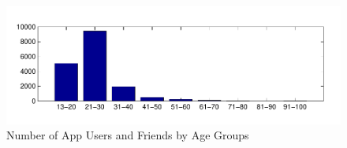 \begin{figure}[t!]
\centering
\includegraphics[scale=0.5]{data/age_groups_linkr_users_friends.pdf}
\vspace{-25pt}
\caption{\small Number of App Users and Friends by Age Groups}
\label{fig:agegroups:usersfriends}
\end{figure}


